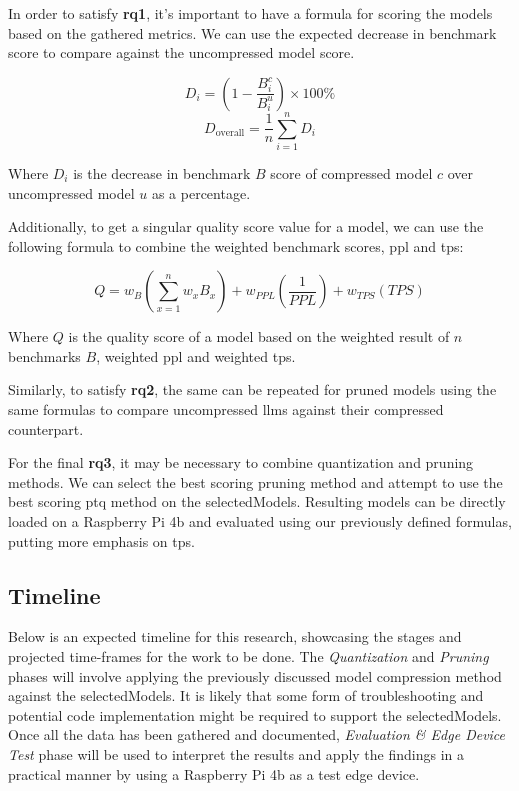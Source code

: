 \documentclass{ifacconf}
\begin{document}
	In order to satisfy \textbf{\gls{rq}1}, it's important to have a formula for scoring the models based on the gathered metrics. We can use the expected decrease in benchmark score to compare against the uncompressed model score. 
	
	$$
		D_i = \left(1 - \frac{B_i^c}{B_i^u}\right) \times 100\%
	$$
	$$
		D_{\text{overall}} = \frac{1}{n} \sum_{i=1}^{n} D_i
	$$
	
	Where $D_i$ is the decrease in benchmark $B$ score of compressed model $c$ over uncompressed model $u$ as a percentage.
	
	Additionally, to get a singular quality score value for a model, we can use the following formula to combine the weighted benchmark scores, \gls{ppl} and \gls{tps}:
	
	$$
	Q = w_{B} \left( \sum_{x=1}^{n} w_x B_x \right) + w_{PPL} \left( \frac{1}{PPL} \right) + w_{TPS}(TPS) 
	$$
	
	Where $Q$ is the quality score of a model based on the weighted result of $n$ benchmarks $B$, weighted \gls{ppl} and weighted \gls{tps}.
	
	Similarly, to satisfy \textbf{\gls{rq}2}, the same can be repeated for pruned models using the same formulas to compare uncompressed \glspl{llm} against their compressed counterpart.
	
	For the final \textbf{\gls{rq}3}, it may be necessary to combine quantization and pruning methods. We can select the best scoring pruning method and attempt to use the best scoring \gls{ptq} method on the \gls{selectedModels}. Resulting models can be directly loaded on a Raspberry Pi 4b and evaluated using our previously defined formulas, putting more emphasis on \gls{tps}.
	
	\subsection{Timeline}
	
	Below is an expected timeline for this research, showcasing the stages and projected time-frames for the work to be done. The \textit{Quantization} and \textit{Pruning} phases will involve applying the previously discussed model compression method against the \gls{selectedModels}. It is likely that some form of troubleshooting and potential code implementation might be required to support the \gls{selectedModels}. Once all the data has been gathered and documented, \textit{Evaluation \& Edge Device Test} phase will be used to interpret the results and apply the findings in a practical manner by using a Raspberry Pi 4b as a test edge device.
	
\end{document}
